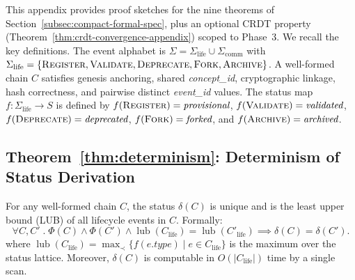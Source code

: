 This appendix provides proof sketches for the nine theorems of Section~\ref{subsec:compact-formal-spec}, plus an optional CRDT property (Theorem~\ref{thm:crdt-convergence-appendix}) scoped to Phase~3. We recall the key definitions. The event alphabet is $\Sigma = \Sigma_{\text{life}} \cup \Sigma_{\text{comm}}$ with $\Sigma_{\text{life}} = \{\textsc{Register}, \textsc{Validate}, \textsc{Deprecate}, \textsc{Fork}, \textsc{Archive}\}$. A well-formed chain $C$ satisfies genesis anchoring, shared \textit{concept\_id}, cryptographic linkage, hash correctness, and pairwise distinct \textit{event\_id} values. The status map $f: \Sigma_{\text{life}} \to S$ is defined by $f(\textsc{Register}) = \textit{provisional}$, $f(\textsc{Validate}) = \textit{validated}$, $f(\textsc{Deprecate}) = \textit{deprecated}$, $f(\textsc{Fork}) = \textit{forked}$, and $f(\textsc{Archive}) = \textit{archived}$.

\subsection{Theorem~\ref{thm:determinism}: Determinism of Status Derivation}

\begin{theorem}[Determinism]\label{thm:determinism}
For any well-formed chain $C$, the status $\delta(C)$ is unique and is the least upper bound (LUB) of all lifecycle events in $C$. Formally:
\begin{equation}
    \forall C, C' \; . \; \Phi(C) \land \Phi(C') \land \operatorname{lub}(C_{\text{life}}) = \operatorname{lub}(C'_{\text{life}}) \implies \delta(C) = \delta(C').
\end{equation}
where $\operatorname{lub}(C_{\text{life}}) = \max_{\prec}\{f(e.\textit{type}) \mid e \in C_{\text{life}}\}$ is the maximum over the status lattice. Moreover, $\delta(C)$ is computable in $O(|C_{\text{life}}|)$ time by a single scan.
\end{theorem}

